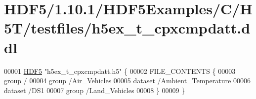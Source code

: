 \hypertarget{_h_d_f5_21_810_81_2_h_d_f5_examples_2_c_2_h5_t_2testfiles_2h5ex__t__cpxcmpdatt_8ddl_source}{}\section{H\+D\+F5/1.10.1/\+H\+D\+F5\+Examples/\+C/\+H5\+T/testfiles/h5ex\+\_\+t\+\_\+cpxcmpdatt.ddl}
\label{_h_d_f5_21_810_81_2_h_d_f5_examples_2_c_2_h5_t_2testfiles_2h5ex__t__cpxcmpdatt_8ddl_source}

\begin{DoxyCode}
00001 \hyperlink{namespace_h_d_f5}{HDF5} \textcolor{stringliteral}{"h5ex\_t\_cpxcmpdatt.h5"} \{
00002 FILE\_CONTENTS \{
00003  group      /
00004  group      /Air\_Vehicles
00005  dataset    /Ambient\_Temperature
00006  dataset    /DS1
00007  group      /Land\_Vehicles
00008  \}
00009 \}
\end{DoxyCode}
